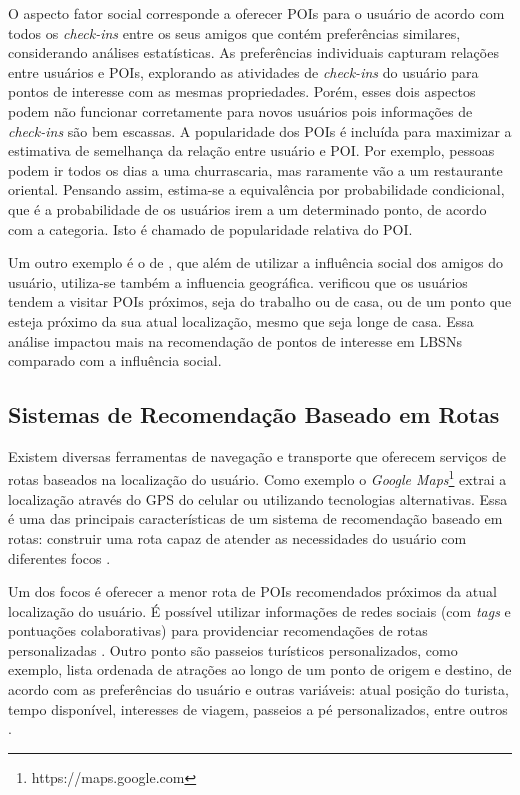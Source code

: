 O aspecto fator social corresponde a oferecer POIs para o usuário de acordo com todos os \textit{check-ins} entre os seus amigos que contém preferências similares, considerando análises estatísticas. As preferências individuais capturam relações entre usuários e POIs, explorando as atividades de \textit{check-ins} do usuário para pontos de interesse com as mesmas propriedades. Porém, esses dois aspectos podem não funcionar corretamente para novos usuários pois informações de \textit{check-ins} são bem escassas. A popularidade dos POIs é incluída para maximizar a estimativa de semelhança da relação entre usuário e POI. Por exemplo, pessoas podem ir todos os dias a uma churrascaria, mas raramente vão a um restaurante oriental. Pensando assim, estima-se a equivalência por probabilidade condicional, que é a probabilidade de os usuários irem a um determinado ponto, de acordo com a categoria. Isto é chamado de popularidade relativa do POI.

Um outro exemplo é o de \cite{Ye:2011:EGI:2009916.2009962}, que além de utilizar a influência social dos amigos do usuário, utiliza-se também a influencia geográfica. \cite{Ye:2011:EGI:2009916.2009962} verificou que os usuários tendem a visitar POIs próximos, seja do trabalho ou de casa, ou de um ponto que esteja próximo da sua atual localização, mesmo que seja longe de casa. Essa análise impactou mais na recomendação de pontos de interesse em LBSNs comparado com a influência social.

\subsection{Sistemas de Recomendação Baseado em Rotas}
\label{subsec:eTourism_recSys_routes}

Existem diversas ferramentas de navegação e transporte que oferecem serviços de rotas baseados na localização do usuário. Como exemplo o \textit{Google Maps}\footnote{https://maps.google.com} extrai a localização através do GPS do celular ou utilizando tecnologias alternativas. Essa é uma das principais características de um sistema de recomendação baseado em rotas: construir uma rota capaz de atender as necessidades do usuário com diferentes focos \citep{GAVALAS2014319}.

Um dos focos é oferecer a menor rota de POIs recomendados próximos da atual localização do usuário. É possível utilizar informações de redes sociais (com \textit{tags} e pontuações colaborativas) para providenciar recomendações de rotas personalizadas \citep{GAVALAS2014319}. Outro ponto são passeios turísticos personalizados, como exemplo, lista ordenada de atrações ao longo de um ponto de origem e destino, de acordo com as preferências do usuário e outras variáveis: atual posição do turista, tempo disponível, interesses de viagem, passeios a pé personalizados, entre outros \citep{GAVALAS2014319}.

